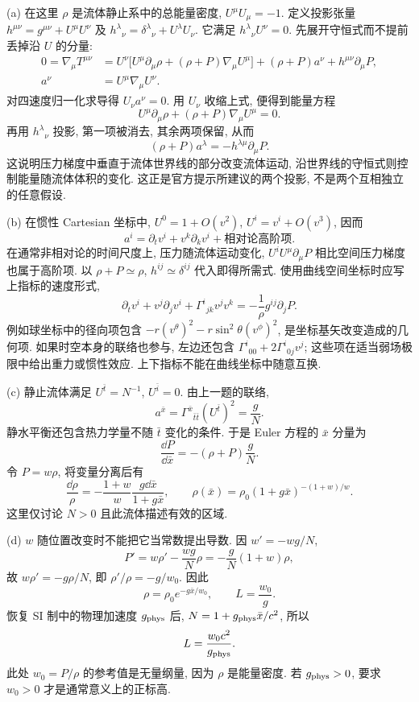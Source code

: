 \begin{solution}
(a) 在这里 $\rho$ 是流体静止系中的总能量密度, $U^\mu U_\mu=-1$. 定义投影张量 $h^{\mu\nu}=g^{\mu\nu}+U^\mu U^\nu$ 及 $h^\lambda{}_\nu=\delta^\lambda{}_\nu+U^\lambda U_\nu$. 它满足 $h^\lambda{}_\nu U^\nu=0$. 先展开守恒式而不提前丢掉沿 $U$ 的分量:
\begin{align*}
0=\nabla_\mu T^{\mu\nu}
&=U^\nu\bigl[U^\mu\partial_\mu\rho+(\rho+P)\nabla_\mu U^\mu\bigr]
 +(\rho+P)a^\nu+h^{\mu\nu}\partial_\mu P,\\
a^\nu&=U^\mu\nabla_\mu U^\nu.
\end{align*}
对四速度归一化求导得 $U_\nu a^\nu=0$. 用 $U_\nu$ 收缩上式, 便得到能量方程
\[
U^\mu\partial_\mu\rho+(\rho+P)\nabla_\mu U^\mu=0.
\]
再用 $h^\lambda{}_\nu$ 投影, 第一项被消去, 其余两项保留, 从而
\[
(\rho+P)a^\lambda=-h^{\lambda\mu}\partial_\mu P.
\]
这说明压力梯度中垂直于流体世界线的部分改变流体运动, 沿世界线的守恒式则控制能量随流体体积的变化. 这正是官方提示所建议的两个投影, 不是两个互相独立的任意假设.

(b) 在惯性 Cartesian 坐标中, $U^0=1+O(v^2)$, $U^i=v^i+O(v^3)$, 因而
\[
a^i=\partial_tv^i+v^k\partial_kv^i+\text{相对论高阶项}.
\]
在通常非相对论的时间尺度上, 压力随流体运动变化, $U^iU^\mu\partial_\mu P$ 相比空间压力梯度也属于高阶项. 以 $\rho+P\simeq\rho$, $h^{ij}\simeq\delta^{ij}$ 代入即得所需式. 使用曲线空间坐标时应写上指标的速度形式,
\[
\partial_tv^i+v^j\partial_jv^i+\Gamma^i{}_{jk}v^jv^k
=-\frac1\rho g^{ij}\partial_jP.
\]
例如球坐标中的径向项包含 $-r(v^\theta)^2-r\sin^2\theta(v^\phi)^2$, 是坐标基矢改变造成的几何项. 如果时空本身的联络也参与, 左边还包含 $\Gamma^i{}_{00}+2\Gamma^i{}_{0j}v^j$; 这些项在适当弱场极限中给出重力或惯性效应. 上下指标不能在曲线坐标中随意互换.

(c) 静止流体满足 $U^{\bar t}=N^{-1}$, $U^{\bar i}=0$. 由上一题的联络,
\[
a^{\bar x}=\Gamma^{\bar x}{}_{\bar t\bar t}(U^{\bar t})^2=\frac gN.
\]
静水平衡还包含热力学量不随 $\bar t$ 变化的条件. 于是 Euler 方程的 $\bar x$ 分量为
\[
\frac{\dd P}{\dd\bar x}=-(\rho+P)\frac gN.
\]
令 $P=w\rho$, 将变量分离后有
\[
\frac{\dd\rho}{\rho}=-\frac{1+w}{w}\frac{g\dd\bar x}{1+g\bar x},
\qquad
\rho(\bar x)=\rho_0(1+g\bar x)^{-(1+w)/w}.
\]
这里仅讨论 $N>0$ 且此流体描述有效的区域.

(d) $w$ 随位置改变时不能把它当常数提出导数. 因 $w'=-wg/N$,
\[
P'=w\rho'-\frac{wg}{N}\rho
=-\frac gN(1+w)\rho,
\]
故 $w\rho'=-g\rho/N$, 即 $\rho'/\rho=-g/w_0$. 因此
\[
\rho=\rho_0e^{-g\bar x/w_0},\qquad L=\frac{w_0}{g}.
\]
恢复 SI 制中的物理加速度 $g_{\rm phys}$ 后, $N=1+g_{\rm phys}\bar x/c^2$, 所以
\[
L=\frac{w_0c^2}{g_{\rm phys}}.
\]
此处 $w_0=P/\rho$ 的参考值是无量纲量, 因为 $\rho$ 是能量密度. 若 $g_{\rm phys}>0$, 要求 $w_0>0$ 才是通常意义上的正标高.


\end{solution}
